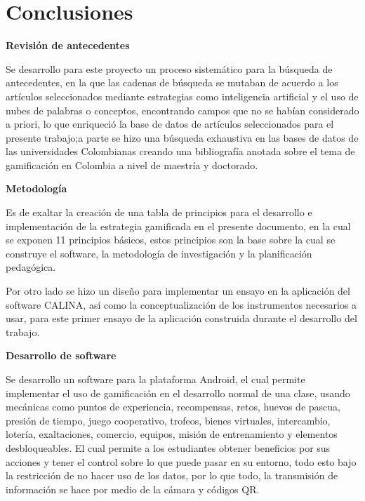 %

\section{Conclusiones}

\textbf{Revisión de antecedentes}

Se desarrollo para este proyecto un proceso sistemático para la búsqueda de antecedentes, en la que las 
cadenas de búsqueda se mutaban de acuerdo a los artículos seleccionados mediante estrategias como inteligencia 
artificial y el uso de nubes de palabras o conceptos, encontrando campos que no se habían considerado a 
priori, lo que enriqueció la base de datos de artículos seleccionados para el presente trabajo;a parte se hizo 
una búsqueda exhaustiva en las bases de datos de las universidades Colombianas creando una bibliografía 
anotada sobre el tema de gamificación en Colombia a nivel de maestría y doctorado.

\textbf{Metodología}

Es de exaltar la creación de una tabla de principios para el desarrollo e implementación de la estrategia 
gamificada en el presente documento, en la cual se exponen 11 principios básicos, estos principios son la base 
sobre la cual se construye el software, la metodología de investigación y la planificación pedagógica.

Por otro lado se hizo un diseño para implementar un ensayo en la aplicación del software CALINA, así como la 
conceptualización de los instrumentos necesarios a usar, para este primer ensayo de la aplicación construida 
durante el desarrollo del trabajo.

\textbf{Desarrollo de software}

Se desarrollo un software para la plataforma Android, el cual permite implementar el uso de gamificación en el 
desarrollo normal de una clase, usando mecánicas como puntos de experiencia, recompensas, retos, huevos de 
pascua, presión de tiempo, juego cooperativo, trofeos, bienes virtuales, intercambio, lotería, exaltaciones,
comercio, equipos, misión de entrenamiento y elementos desbloqueables. El cual permite a los estudiantes 
obtener beneficios por sus acciones y tener el control sobre lo que puede pasar en su entorno, todo esto bajo 
la restricción de no hacer uso de los datos, por lo que todo, la transmisión de información se hace por medio 
de la cámara y códigos QR.

